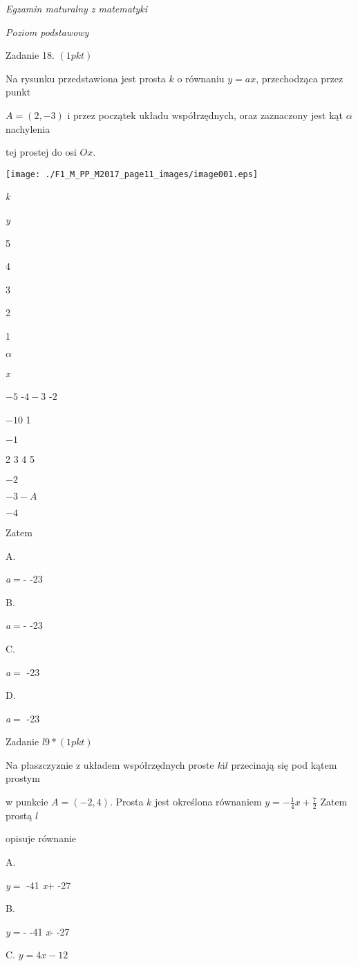 \documentclass[a4paper,12pt]{article}
\begin{document}
{\it Egzamin maturalny z matematyki}

{\it Poziom podstawowy}

Zadanie 18. $(1pkt)$

Na rysunku przedstawiona jest prosta $k$ o równaniu $y=ax$, przechodząca przez punkt

$A=(2,-3)$ i przez początek układu współrzędnych, oraz zaznaczony jest kąt $\alpha$ nachylenia

tej prostej do osi $Ox.$
\begin{center}
\texttt{[image: ./F1\_M\_PP\_M2017\_page11\_images/image001.eps]}
\end{center}
{\it k}

{\it y}

5

4

3

2

1

$\alpha$

{\it x}

$-5$ -$4  -3$ -$2$

$-1 0$ 1

$-1$

2 3  4 5

$-2$

$-3  -A$

$-4$

Zatem

A.

{\it a}$=$- -23

B.

{\it a}$=$- -23

C.

{\it a}$=$ -23

D.

{\it a}$=$ -23

Zadanie $l9*(1pkt)$

Na płaszczyz$\acute{}$nie z układem współrzędnych proste $k\mathrm{i} l$ przecinają się pod kątem prostym

w punkcie $A=(-2,4)$. Prosta $k$ jest określona równaniem $y=-\displaystyle \frac{1}{4}x+\frac{7}{2}$ Zatem prostą $l$

opisuje równanie

A.

{\it y}$=$ -41 {\it x}$+$ -27

B.

{\it y}$=$- -41 {\it x}- -27

C. $y=4x-12$
\end{document}
